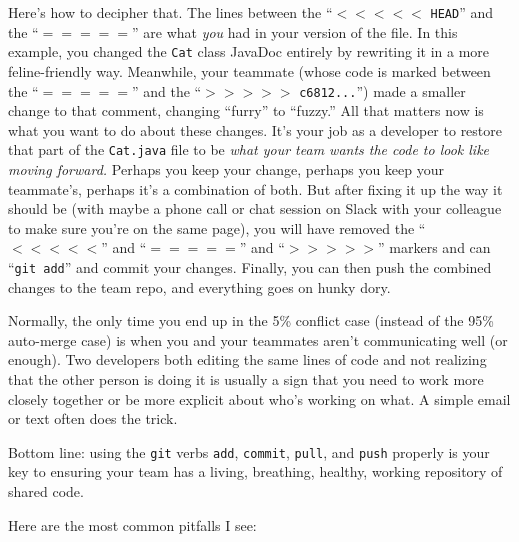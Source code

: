 \begin{itemize}
Here's how to decipher that. The lines between the ``$<<<<<$ \texttt{HEAD}''
and the ``$=====$'' are what \textit{you} had in your version of the file. In
this example, you changed the \texttt{Cat} class JavaDoc entirely by rewriting
it in a more feline-friendly way. Meanwhile, your teammate (whose code is
marked between the ``$=====$'' and the ``$>>>>>$ \texttt{c6812...}'') made a
smaller change to that comment, changing ``furry'' to ``fuzzy.'' All that
matters now is what you want to do about these changes. It's your job as a
developer to restore that part of the \texttt{Cat.java} file to be \textit{what
your team wants the code to look like moving forward.} Perhaps you keep your
change, perhaps you keep your teammate's, perhaps it's a combination of both.
But after fixing it up the way it should be (with maybe a phone call or chat
session on Slack with your colleague to make sure you're on the same page), you
will have removed the ``$<<<<<$'' and ``$=====$'' and ``$>>>>>$'' markers and
can ``\texttt{git add}'' and commit your changes. Finally, you can then push
the combined changes to the team repo, and everything goes on hunky dory.

Normally, the only time you end up in the 5\% conflict case (instead of the
95\% auto-merge case) is when you and your teammates aren't communicating well
(or enough). Two developers both editing the same lines of code and not
realizing that the other person is doing it is usually a sign that you need to
work more closely together or be more explicit about who's working on what. A
simple email or text often does the trick.

\end{itemize}


Bottom line: using the \texttt{git} verbs \texttt{add}, \texttt{commit},
\texttt{pull}, and \texttt{push} properly is your key to ensuring your team
has a living, breathing, healthy, working repository of shared code.

Here are the most common pitfalls I see:



